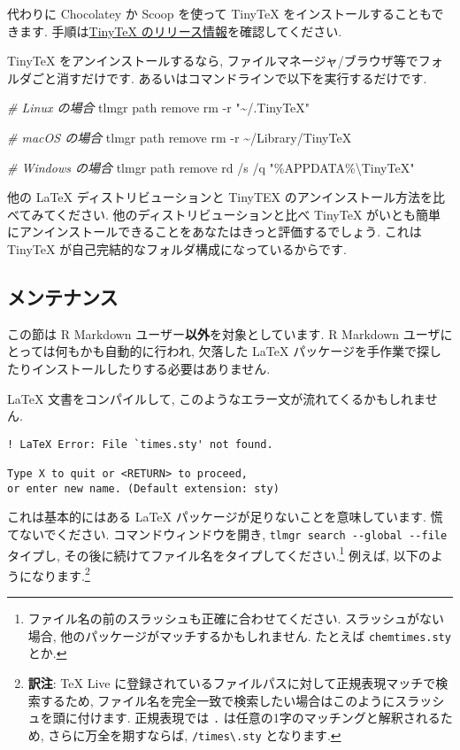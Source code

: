 \documentclass[
  xelatex,ja=standard,jafont=noto]{bxjsreport}
\newenvironment{Shaded}{\begin{snugshade}}{\end{snugshade}}
\newcommand{\AttributeTok}[1]{\textcolor[rgb]{0.77,0.63,0.00}{#1}}
\newcommand{\CommentTok}[1]{\textcolor[rgb]{0.56,0.35,0.01}{\textit{#1}}}
\newcommand{\ExtensionTok}[1]{#1}
\newcommand{\FunctionTok}[1]{\textcolor[rgb]{0.00,0.00,0.00}{#1}}
\newcommand{\NormalTok}[1]{#1}
\newcommand{\StringTok}[1]{\textcolor[rgb]{0.31,0.60,0.02}{#1}}
\begin{document}
代わりに Chocolatey か Scoop を使って TinyTeX
をインストールすることもできます.
手順は\href{https://github.com/yihui/tinytex-releases}{TinyTeX
のリリース情報}を確認してください.

TinyTeX をアンインストールするなら,
ファイルマネージャ/ブラウザ等でフォルダごと消すだけです.
あるいはコマンドラインで以下を実行するだけです.

\begin{Shaded}
\begin{Highlighting}[]
\CommentTok{\# Linux の場合}
\ExtensionTok{tlmgr}\NormalTok{ path remove}
\FunctionTok{rm} \AttributeTok{{-}r} \StringTok{"\textasciitilde{}/.TinyTeX"}

\CommentTok{\# macOS の場合}
\ExtensionTok{tlmgr}\NormalTok{ path remove}
\FunctionTok{rm} \AttributeTok{{-}r}\NormalTok{ \textasciitilde{}/Library/TinyTeX}

\CommentTok{\# Windows の場合}
\ExtensionTok{tlmgr}\NormalTok{ path remove}
\ExtensionTok{rd}\NormalTok{ /s /q }\StringTok{"\%APPDATA\%\textbackslash{}TinyTeX"}
\end{Highlighting}
\end{Shaded}

他の LaTeX ディストリビューションと TinyTEX
のアンインストール方法を比べてみてください.
他のディストリビューションと比べ TinyTeX
がいとも簡単にアンインストールできることをあなたはきっと評価するでしょう.
これは TinyTeX が自己完結的なフォルダ構成になっているからです.

\hypertarget{ux30e1ux30f3ux30c6ux30caux30f3ux30b9}{%
\subsection{メンテナンス}\label{ux30e1ux30f3ux30c6ux30caux30f3ux30b9}}

この節は R Markdown ユーザー\textbf{以外}を対象としています. R Markdown
ユーザにとっては何もかも自動的に行われ, 欠落した LaTeX
パッケージを手作業で探したりインストールしたりする必要はありません.

LaTeX 文書をコンパイルして,
このようなエラー文が流れてくるかもしれません.

\begin{verbatim}
! LaTeX Error: File `times.sty' not found.

Type X to quit or <RETURN> to proceed,
or enter new name. (Default extension: sty)
\end{verbatim}

これは基本的にはある LaTeX パッケージが足りないことを意味しています.
慌てないでください. コマンドウィンドウを開き,
\texttt{tlmgr\ search\ -\/-global\ -\/-file} タイプし,
その後に続けてファイル名をタイプしてください.\footnote{ファイル名の前のスラッシュも正確に合わせてください.
  スラッシュがない場合, 他のパッケージがマッチするかもしれません.
  たとえば \texttt{chemtimes.sty} とか.} 例えば,
以下のようになります.\footnote{\textbf{訳注}: TeX Live
  に登録されているファイルパスに対して正規表現マッチで検索するため,
  ファイル名を完全一致で検索したい場合はこのようにスラッシュを頭に付けます.
  正規表現では \texttt{.} は任意の1字のマッチングと解釈されるため,
  さらに万全を期すならば, \texttt{/times\textbackslash{}.sty}
  となります.}
\end{document}
